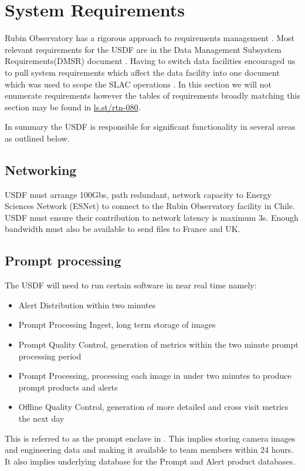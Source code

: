 \section{System Requirements} \label{sec:requirements}

Rubin Observatory has a rigorous approach to requirements management \cite{2016SPIE.9911E..0DS}.
Most relevant requirements for the USDF are in the Data Management Subsystem Requirements(DMSR) document \cite{LSE-61}.
Having to switch data facilities encouraged us to pull system requirements which affect the data facility into one document
which was used to scope the SLAC operations \cite{rtn-080}.
In this section we will not enumerate requirements however the tables of requirements broadly matching this section may be found in \href{RTN-080}{ls.st/rtn-080}.

In summary the USDF is responsible for significant functionality in several areas as outlined below.


\subsection{Networking } \label{sec:networking}

USDF must arrange 100Gbs, path redundant, network capacity to Energy Sciences Network (ESNet) to connect to the Rubin Observatory facility in Chile.
USDF must ensure their contribution to network latency is maximum 3s.
Enough bandwidth must also be available to send files to France and UK.

\subsection{Prompt processing} \label{sec:prompproc}
The USDF will need to run certain software in near real time namely:
\begin{itemize}
\item Alert Distribution within two minutes
\item Prompt Processing Ingest, long term storage of images
\item Prompt Quality Control, generation of metrics within the two minute prompt processing period
\item Prompt Processing, processing each image in under two minutes to produce prompt products and alerts
\item Offline Quality Control, generation of more detailed and cross visit metrics the next day
\end{itemize}
This is referred to as the prompt enclave in \cite{DMTN-104}.
This implies storing camera images and engineering data and making it available to team members within 24 hours.
It also implies underlying database for the Prompt and Alert product databases.

